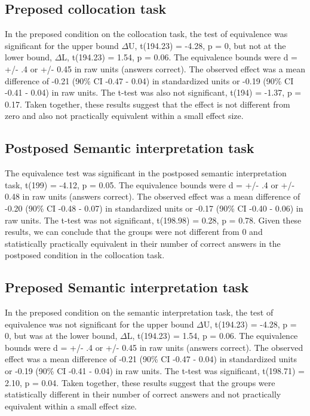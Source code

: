 \documentclass[
  man]{apa6}
\begin{document}
\hypertarget{preposed-collocation-task}{%
\subsection{Preposed collocation task}\label{preposed-collocation-task}}

In the preposed condition on the collocation task, the test of equivalence was significant for the upper bound \(\Delta\)U, t(194.23) = -4.28, p = 0, but not at the lower bound, \(\Delta\)L, t(194.23) = 1.54, p = 0.06.
The equivalence bounds were d = +/- .4 or +/- 0.45 in raw units (answers correct).
The observed effect was a mean difference of -0.21 (90\% CI -0.47 - 0.04) in standardized units or -0.19 (90\% CI -0.41 - 0.04) in raw units.
The t-test was also not significant, t(194) = -1.37, p = 0.17.
Taken together, these results suggest that the effect is not different from zero and also not practically equivalent within a small effect size.

\hypertarget{postposed-semantic-interpretation-task}{%
\subsection{Postposed Semantic interpretation task}\label{postposed-semantic-interpretation-task}}

The equivalence test was significant in the postposed semantic interpretation task, t(199) = -4.12, p = 0.05.
The equivalence bounds were d = +/- .4 or +/- 0.48 in raw units (answers correct).
The observed effect was a mean difference of -0.20 (90\% CI -0.48 - 0.07) in standardized units or -0.17 (90\% CI -0.40 - 0.06) in raw units.
The t-test was not significant, t(198.98) = 0.28, p = 0.78.
Given these results, we can conclude that the groups were not different from 0 and statistically practically equivalent in their number of correct answers in the postposed condition in the collocation task.

\hypertarget{preposed-semantic-interpretation-task}{%
\subsection{Preposed Semantic interpretation task}\label{preposed-semantic-interpretation-task}}

In the preposed condition on the semantic interpretation task, the test of equivalence was not significant for the upper bound \(\Delta\)U, t(194.23) = -4.28, p = 0, but was at the lower bound, \(\Delta\)L, t(194.23) = 1.54, p = 0.06.
The equivalence bounds were d = +/- .4 or +/- 0.45 in raw units (answers correct).
The observed effect was a mean difference of -0.21 (90\% CI -0.47 - 0.04) in standardized units or -0.19 (90\% CI -0.41 - 0.04) in raw units.
The t-test was significant, t(198.71) = 2.10, p = 0.04.
Taken together, these results suggest that the groups were statistically different in their number of correct answers and not practically equivalent within a small effect size.
\end{document}
